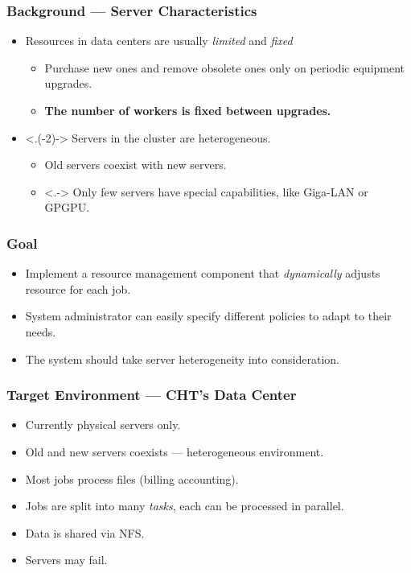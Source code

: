 \begin{frame}
  \frametitle{Background --- Server Characteristics}
  \begin{itemize}[<+->]
    \item Resources in data centers are usually \emph{limited} and
      \emph{fixed}
      \begin{itemize}
        \item Purchase new ones and remove obsolete ones only on
          periodic equipment upgrades.
        \item \textbf{The number of workers is fixed between upgrades.}
      \end{itemize}
    \item <.(-2)-> Servers in the cluster are \alert{heterogeneous}.
      \begin{itemize}
        \item Old servers coexist with new servers.
        \item <.-> Only few servers have special capabilities, like Giga-LAN
          or GPGPU.
      \end{itemize}
  \end{itemize}
\end{frame}
\begin{frame}
  \frametitle{Goal}
  \begin{itemize}
    \item Implement a resource management component that \emph{dynamically}
      adjusts resource for each job.
    \item System administrator can easily specify different policies to
      adapt to their needs.
    \item The system should take server \alert{heterogeneity} into consideration.
  \end{itemize}
\end{frame}
\begin{frame}
  \frametitle{Target Environment --- CHT's Data Center}
  \begin{itemize}
	\item Currently physical servers only.
    \item Old and new servers coexists --- heterogeneous environment.
    \item Most jobs process files (billing accounting).
    \item Jobs are split into many \emph{tasks}, each can be processed
      in parallel.
    \item Data is shared via NFS.
    \item Servers may fail.
  \end{itemize}
\end{frame}


